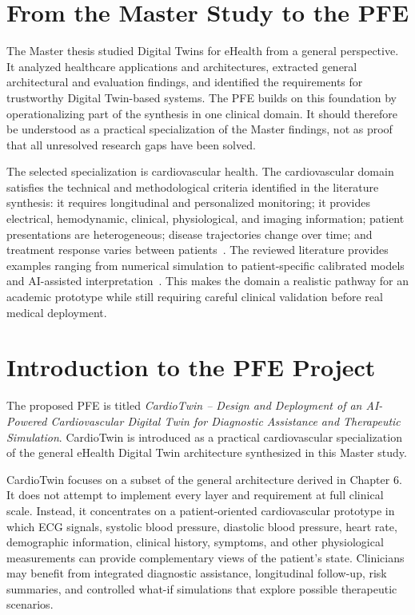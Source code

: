 \section{From the Master Study to the PFE}
The Master thesis studied Digital Twins for eHealth from a general perspective. It analyzed healthcare applications and architectures, extracted general architectural and evaluation findings, and identified the requirements for trustworthy Digital Twin-based systems. The PFE builds on this foundation by operationalizing part of the synthesis in one clinical domain. It should therefore be understood as a practical specialization of the Master findings, not as proof that all unresolved research gaps have been solved.

The selected specialization is cardiovascular health. The cardiovascular domain satisfies the technical and methodological criteria identified in the literature synthesis: it requires longitudinal and personalized monitoring; it provides electrical, hemodynamic, clinical, physiological, and imaging information; patient presentations are heterogeneous; disease trajectories change over time; and treatment response varies between patients~\cite{coorey2022health,corralacero2020digital}. The reviewed literature provides examples ranging from numerical simulation to patient-specific calibrated models and AI-assisted interpretation~\cite{geddes2025right,gu2025heartfailure}. This makes the domain a realistic pathway for an academic prototype while still requiring careful clinical validation before real medical deployment.

\section{Introduction to the PFE Project}
The proposed PFE is titled \textit{CardioTwin -- Design and Deployment of an AI-Powered Cardiovascular Digital Twin for Diagnostic Assistance and Therapeutic Simulation}. CardioTwin is introduced as a practical cardiovascular specialization of the general eHealth Digital Twin architecture synthesized in this Master study.

CardioTwin focuses on a subset of the general architecture derived in Chapter 6. It does not attempt to implement every layer and requirement at full clinical scale. Instead, it concentrates on a patient-oriented cardiovascular prototype in which ECG signals, systolic blood pressure, diastolic blood pressure, heart rate, demographic information, clinical history, symptoms, and other physiological measurements can provide complementary views of the patient's state. Clinicians may benefit from integrated diagnostic assistance, longitudinal follow-up, risk summaries, and controlled what-if simulations that explore possible therapeutic scenarios.

